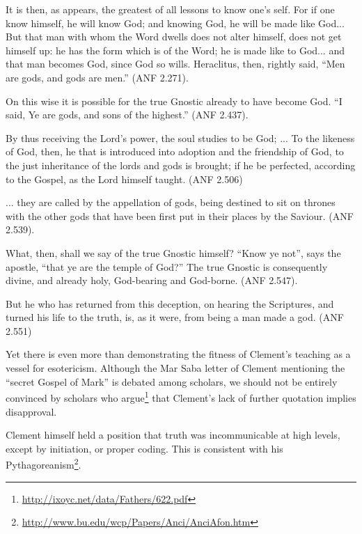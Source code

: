 \begin{quotex}
It is then, as appears, the greatest of all lessons to know one's self. For if one know himself, he will know God; and knowing God, he will be made like God... But that man with whom the Word dwells does not alter himself, does not get himself up: he has the form which is of the Word; he is made like to God... and that man becomes God, since God so wills. Heraclitus, then, rightly said, ``Men are gods, and gods are men.'' (ANF 2.271). 

On this wise it is possible for the true Gnostic already to have become God. ``I said, Ye are gods, and sons of the highest.'' (ANF 2.437). 

By thus receiving the Lord's power, the soul studies to be God; ... To the likeness of God, then, he that is introduced into adoption and the friendship of God, to the just inheritance of the lords and gods is brought; if he be perfected, according to the Gospel, as the Lord himself taught. (ANF 2.506) 

... they are called by the appellation of gods, being destined to sit on thrones with the other gods that have been first put in their places by the Saviour. (ANF 2.539). 

What, then, shall we say of the true Gnostic himself? ``Know ye not'', says the apostle, ``that ye are the temple of God?'' The true Gnostic is consequently divine, and already holy, God-bearing and God-borne. (ANF 2.547). 

But he who has returned from this deception, on hearing the Scriptures, and turned his life to the truth, is, as it were, from being a man made a god. (ANF 2.551) 
\end{quotex}


Yet there is even more than demonstrating the fitness of Clement's teaching as a vessel for esotericism. Although the Mar Saba letter of Clement mentioning the ``secret Gospel of Mark'' is debated among scholars, we should not be entirely convinced by scholars who argue\footnote{\url{http://ixoyc.net/data/Fathers/622.pdf}} that Clement's lack of further quotation implies disapproval.

Clement himself held a position that truth was incommunicable at high levels, except by initiation, or proper coding. This is consistent with his Pythagoreanism\footnote{\url{http://www.bu.edu/wcp/Papers/Anci/AnciAfon.htm}}.

